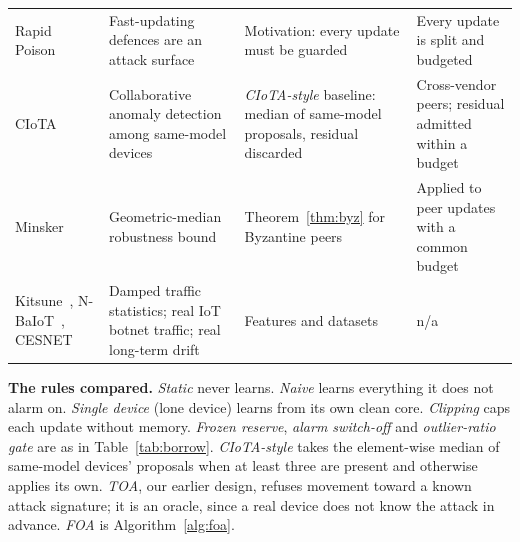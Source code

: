 \begin{table}[t]
\begin{tabular}{@{}p{3.0cm}p{4.2cm}p{4.4cm}p{4.9cm}@{}}
Rapid Poison~\cite{rapidpoison} & Fast-updating defences are an attack surface & Motivation: every update must be guarded & Every update is split and budgeted \\
CIoTA~\cite{ciota} & Collaborative anomaly detection among same-model devices & \emph{CIoTA-style} baseline: median of same-model proposals, residual discarded & Cross-vendor peers; residual admitted within a budget \\
Minsker~\cite{minsker} & Geometric-median robustness bound & Theorem~\ref{thm:byz} for Byzantine peers & Applied to peer updates with a common budget \\
Kitsune~\cite{kitsune}, N-BaIoT~\cite{nbaiot}, CESNET~\cite{cesnet} & Damped traffic statistics; real IoT botnet traffic; real long-term drift & Features and datasets & n/a \\
\bottomrule
\end{tabular}
\end{table}

\textbf{The rules compared.} \emph{Static} never learns. \emph{Naive} learns everything it does not alarm
on. \emph{Single device} (lone device) learns from its own clean core. \emph{Clipping} caps each update
without memory. \emph{Frozen reserve}, \emph{alarm switch-off} and \emph{outlier-ratio gate} are as in
Table~\ref{tab:borrow}. \emph{CIoTA-style} takes the element-wise median of same-model devices' proposals
when at least three are present and otherwise applies its own. \emph{TOA}, our earlier design, refuses
movement toward a known attack signature; it is an oracle, since a real device does not know the attack
in advance. \emph{FOA} is Algorithm~\ref{alg:foa}.
